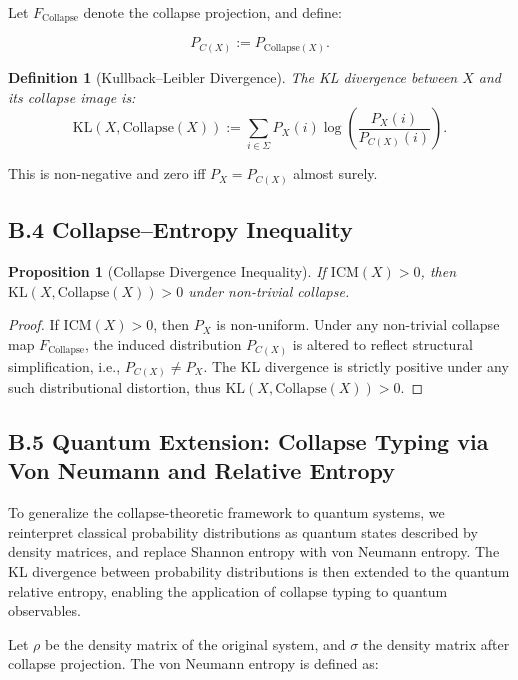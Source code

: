 \documentclass[11pt]{article}
\newtheorem{definition}[theorem]{Definition}
\newtheorem{proposition}[theorem]{Proposition}
\begin{document}
Let \( F_{\mathrm{Collapse}} \) denote the collapse projection, and define:

\[
P_{C(X)} := P_{\mathrm{Collapse}(X)}.
\]

\begin{definition}[Kullback–Leibler Divergence]
The KL divergence between \( X \) and its collapse image is:
\[
\mathrm{KL}(X, \mathrm{Collapse}(X)) := \sum_{i \in \Sigma} P_X(i) \log \left( \frac{P_X(i)}{P_{C(X)}(i)} \right).
\]
\end{definition}

This is non-negative and zero iff \( P_X = P_{C(X)} \) almost surely.

\subsection*{B.4 Collapse–Entropy Inequality}

\begin{proposition}[Collapse Divergence Inequality]
If \( \mathrm{ICM}(X) > 0 \), then \( \mathrm{KL}(X, \mathrm{Collapse}(X)) > 0 \) under non-trivial collapse.
\end{proposition}

\begin{proof}
If \( \mathrm{ICM}(X) > 0 \), then \( P_X \) is non-uniform. Under any non-trivial collapse map \( F_{\mathrm{Collapse}} \), the induced distribution \( P_{C(X)} \) is altered to reflect structural simplification, i.e., \( P_{C(X)} \neq P_X \). The KL divergence is strictly positive under any such distributional distortion, thus \( \mathrm{KL}(X, \mathrm{Collapse}(X)) > 0 \).
\end{proof}

\subsection*{B.5 Quantum Extension: Collapse Typing via Von Neumann and Relative Entropy}

To generalize the collapse-theoretic framework to quantum systems, we reinterpret classical probability distributions as quantum states described by density matrices, and replace Shannon entropy with von Neumann entropy. The KL divergence between probability distributions is then extended to the quantum relative entropy, enabling the application of collapse typing to quantum observables.

Let \( \rho \) be the density matrix of the original system, and \( \sigma \) the density matrix after collapse projection. The von Neumann entropy is defined as:
\end{document}
